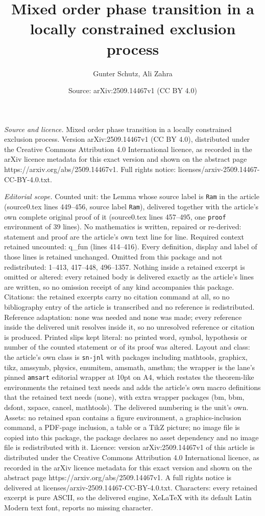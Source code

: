 \documentclass[10pt,a4paper]{amsart}
\title[Mixed order phase transition in a locally constrained exclus]{Mixed order phase transition in a locally constrained exclusion process}
\author{Gunter Schutz, Ali Zahra}
\date{Source: arXiv:2509.14467v1 (CC BY 4.0)}
\begin{document}
\maketitle

\noindent\emph{Source and licence.} Mixed order phase transition in a locally constrained exclusion process. Version arXiv:2509.14467v1 (CC BY 4.0), distributed under the Creative Commons Attribution 4.0 International licence, as recorded in the arXiv licence metadata for this exact version and shown on the abstract page https://arxiv.org/abs/2509.14467v1. Full rights notice: licenses/arxiv-2509.14467-CC-BY-4.0.txt.\par\smallskip

\noindent\textit{Editorial scope.} Counted unit: the Lemma whose source label is \texttt{Ram} in the article (source0.tex lines 449--456, source label \texttt{Ram}), delivered together with the article's own complete original proof of it (source0.tex lines 457--495, one \texttt{proof} environment of 39 lines). No mathematics is written, repaired or re-derived: statement and proof are the article's own text line for line. Required context retained uncounted: q\_fun (lines 414--416). Every definition, display and label of those lines is retained unchanged. Omitted from this package and not redistributed: 1--413, 417--448, 496--1357. Nothing inside a retained excerpt is omitted or altered: every retained body is delivered exactly as the article's lines are written, so no omission receipt of any kind accompanies this package. Citations: the retained excerpts carry no citation command at all, so no bibliography entry of the article is transcribed and no reference is redistributed. Reference adaptation: none was needed and none was made; every reference inside the delivered unit resolves inside it, so no unresolved reference or citation is produced. Printed slips kept literal: no printed word, symbol, hypothesis or number of the counted statement or of its proof was altered. Layout and class: the article's own class is \texttt{sn-jnl} with packages including mathtools, graphicx, tikz, amssymb, physics, enumitem, amsmath, amsthm; the wrapper is the lane's pinned \texttt{amsart} editorial wrapper at 10pt on A4, which restates the theorem-like environments the retained text needs and adds the article's own macro definitions that the retained text needs (none), with extra wrapper packages (bm, bbm, dsfont, xspace, cancel, mathtools). The delivered numbering is the unit's own. Assets: no retained span contains a figure environment, a graphics-inclusion command, a PDF-page inclusion, a table or a TikZ picture; no image file is copied into this package, the package declares no asset dependency and no image file is redistributed with it. Licence: version arXiv:2509.14467v1 of this article is distributed under the Creative Commons Attribution 4.0 International licence, as recorded in the arXiv licence metadata for this exact version and shown on the abstract page https://arxiv.org/abs/2509.14467v1. A full rights notice is delivered at licenses/arxiv-2509.14467-CC-BY-4.0.txt. Characters: every retained excerpt is pure ASCII, so the delivered engine, XeLaTeX with its default Latin Modern text font, reports no missing character.
\end{document}
